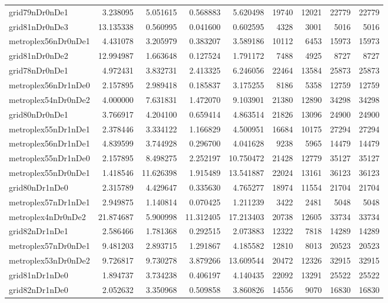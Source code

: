 \begin{longtable}{|l|r|r|r|r|r|r|r|r|}
grid79nDr0nDe1 & 3.238095 & 5.051615 & 0.568883 & 5.620498 & 19740 & 12021 & 22779 & 22779 \\
grid81nDr0nDe3 & 13.135338 & 0.560995 & 0.041600 & 0.602595 & 4328 & 3001 & 5016 & 5016 \\
metroplex56nDr0nDe1 & 4.431078 & 3.205979 & 0.383207 & 3.589186 & 10112 & 6453 & 15973 & 15973 \\
grid81nDr0nDe2 & 12.994987 & 1.663648 & 0.127524 & 1.791172 & 7488 & 4925 & 8727 & 8727 \\
grid78nDr0nDe1 & 4.972431 & 3.832731 & 2.413325 & 6.246056 & 22464 & 13584 & 25873 & 25873 \\
metroplex56nDr1nDe0 & 2.157895 & 2.989418 & 0.185837 & 3.175255 & 8186 & 5358 & 12759 & 12759 \\
metroplex54nDr0nDe2 & 4.000000 & 7.631831 & 1.472070 & 9.103901 & 21380 & 12890 & 34298 & 34298 \\
grid80nDr0nDe1 & 3.766917 & 4.204100 & 0.659414 & 4.863514 & 21826 & 13096 & 24900 & 24900 \\
metroplex55nDr1nDe1 & 2.378446 & 3.334122 & 1.166829 & 4.500951 & 16684 & 10175 & 27294 & 27294 \\
metroplex56nDr1nDe1 & 4.839599 & 3.744928 & 0.296700 & 4.041628 & 9238 & 5965 & 14479 & 14479 \\
metroplex55nDr1nDe0 & 2.157895 & 8.498275 & 2.252197 & 10.750472 & 21428 & 12779 & 35127 & 35127 \\
metroplex55nDr0nDe1 & 1.418546 & 11.626398 & 1.915489 & 13.541887 & 22024 & 13161 & 36123 & 36123 \\
grid80nDr1nDe0 & 2.315789 & 4.429647 & 0.335630 & 4.765277 & 18974 & 11554 & 21704 & 21704 \\
metroplex57nDr1nDe1 & 2.949875 & 1.140814 & 0.070425 & 1.211239 & 3422 & 2481 & 5048 & 5048 \\
metroplex4nDr0nDe2 & 21.874687 & 5.900998 & 11.312405 & 17.213403 & 20738 & 12605 & 33734 & 33734 \\
grid82nDr1nDe1 & 2.586466 & 1.781368 & 0.292515 & 2.073883 & 12322 & 7818 & 14289 & 14289 \\
metroplex57nDr0nDe1 & 9.481203 & 2.893715 & 1.291867 & 4.185582 & 12810 & 8013 & 20523 & 20523 \\
metroplex53nDr0nDe2 & 9.726817 & 9.730278 & 3.879266 & 13.609544 & 20472 & 12326 & 32915 & 32915 \\
grid81nDr1nDe0 & 1.894737 & 3.734238 & 0.406197 & 4.140435 & 22092 & 13291 & 25522 & 25522 \\
grid82nDr1nDe0 & 2.052632 & 3.350968 & 0.509858 & 3.860826 & 14556 & 9070 & 16830 & 16830 \\

\end{longtable}
